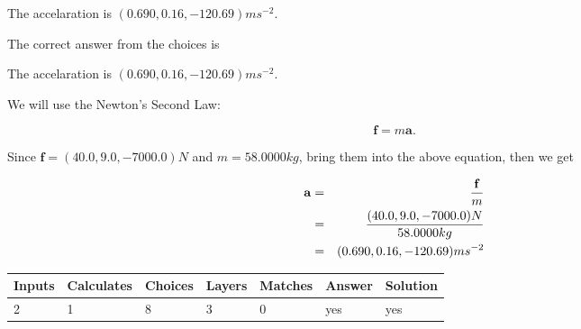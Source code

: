 \documentclass[12pt]{article}
\begin{document}
 
The accelaration is $  %
(
0.690,
0.16,
-120.69)
ms^{-2} $.
 
 
\noindent{}
 
 
 
 
 
\noindent{}
 
 

The correct answer from the choices is


The accelaration is $  %
(
0.690,
0.16,
-120.69)
ms^{-2} $.
 
 
 
\noindent{}
 
 

 
 
 
\noindent{}
 
 

We will use the Newton's Second Law:
 
\[
\mathbf{f}=m\mathbf{a}.
\]
 
Since $\mathbf{f}= %
(40.0 , 9.0 , -7000.0) N$
and $m= %
58.0000kg$, bring them into the above equation, then we get
 
\begin{eqnarray*}
\mathbf{a}&=&\frac{\mathbf{f}}m  \\
&=&\frac{ %
(40.0 , 9.0 , -7000.0) N}{ %
58.0000kg}  \\
&=& %
(0.690 , 0.16 , -120.69) ms^{-2}
\end{eqnarray*}
 
 
 
\noindent{}
 
 

 
\vspace{0.3in}
   
   
   
   
\noindent\begin{tabular}{|l|l|l|l|l|l|l|}
 \hline
Inputs & Calculates & Choices & Layers & Matches & Answer & Solution \\ \hline
           2  & 
           1  & 
           8
  & 
           3  & 
           0  & 
  yes & 
  yes 
  \\ \hline
 \end{tabular}
   
\end{document}
